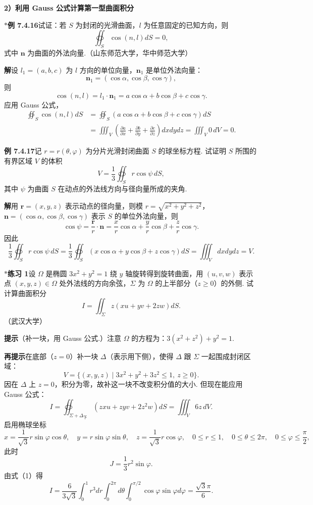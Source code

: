 \documentclass[UTF8, 12pt, fontset=fandol, oneside]{ctexart}
\begin{document}
\noindent\textbf{2）利用 Gauss 公式计算第一型曲面积分}

\noindent\textbf{$*$例 7.4.16}\quad 试证：若 $S$ 为封闭的光滑曲面，$l$ 为任意固定的已知方向，则
\[
\oiint_S\cos(n,l)dS=0,
\]
式中 $\mathbf n$ 为曲面的外法向量.（山东师范大学，华中师范大学）

\noindent\textbf{解}\quad 设 $l_1=(a,b,c)$ 为 $l$ 方向的单位向量，$\mathbf n_1$ 是单位外法向量：
\[
\mathbf n_1=(\cos\alpha,\cos\beta,\cos\gamma),
\]
则
\[
\cos(n,l)=l_1\cdot\mathbf n_1=a\cos\alpha+b\cos\beta+c\cos\gamma.
\]
应用 Gauss 公式，
\[
\begin{aligned}
\oiint_S\cos(n,l)dS
&=\oiint_S(a\cos\alpha+b\cos\beta+c\cos\gamma)dS\\
&=\iiint_V\left(\frac{\partial a}{\partial x}
+\frac{\partial b}{\partial y}
+\frac{\partial c}{\partial z}\right)dxdydz
=\iiint_V0\,dV=0.
\end{aligned}
\]

\noindent\textbf{例 7.4.17}\quad 记 $r=r(\theta,\varphi)$ 为分片光滑封闭曲面 $S$ 的球坐标方程. 试证明 $S$ 所围的有界区域 $V$ 的体积
\[
V=\frac13\oiint_S r\cos\psi\,dS,
\]
其中 $\psi$ 为曲面 $S$ 在动点的外法线方向与径向量所成的夹角.

\noindent\textbf{解}\quad 用 $\mathbf r=(x,y,z)$ 表示动点的径向量，则模 $r=\sqrt{x^2+y^2+z^2}$，$\mathbf n=(\cos\alpha,\cos\beta,\cos\gamma)$ 表示 $S$ 的单位外法向量，则
\[
\cos\psi=\frac{\mathbf r}{r}\cdot\mathbf n
=\frac xr\cos\alpha+\frac yr\cos\beta+\frac zr\cos\gamma.
\]
因此
\[
\frac13\oiint_Sr\cos\psi\,dS
=\frac13\oiint_S(x\cos\alpha+y\cos\beta+z\cos\gamma)dS
=\iiint_Vdxdydz=V.
\]

\noindent\textbf{$*$练习 1}\quad 设 $\Omega$ 是椭圆 $3x^2+y^2=1$ 绕 $y$ 轴旋转得到旋转曲面，用 $(u,v,w)$ 表示点 $(x,y,z)\in\Omega$ 处外法线的方向余弦，$\Sigma$ 为 $\Omega$ 的上半部分（$z\ge0$）的外侧. 试计算曲面积分
\[
I=\iint_\Sigma z(xu+yv+2zw)dS.
\]
（武汉大学）

\noindent\textbf{提示}\quad （补一块，用 Gauss 公式.）注意 $\Omega$ 的方程为：$3(x^2+z^2)+y^2=1$.

\noindent\textbf{再提示}\quad 在底部（$z=0$）补一块 $\Delta$（表示用下侧），使得 $\Delta$ 跟 $\Sigma$ 一起围成封闭区域：
\[
V=\{(x,y,z)\mid 3x^2+y^2+3z^2\le1,\ z\ge0\}.
\]
因在 $\Delta$ 上 $z=0$，积分为零，故补这一块不改变积分值的大小. 但现在能应用 Gauss 公式：
\[
I=\oiint_{\Sigma+\Delta_{\text{下}}}(zxu+zyv+2z^2w)dS
=\iiint_V6z\,dV. \tag{1}
\]
启用椭球坐标
\[
x=\frac1{\sqrt3}r\sin\varphi\cos\theta,\quad
y=r\sin\varphi\sin\theta,\quad
z=\frac1{\sqrt3}r\cos\varphi,\quad
0\le r\le1,\quad0\le\theta\le2\pi,\quad0\le\varphi\le\frac\pi2,
\]
此时
\[
J=\frac13r^2\sin\varphi.
\]
由式（1）得
\[
I=\frac6{3\sqrt3}\int_0^1r^3dr\int_0^{2\pi}d\theta
\int_0^{\pi/2}\cos\varphi\sin\varphi d\varphi
=\frac{\sqrt3\pi}{6}.
\]
\end{document}
